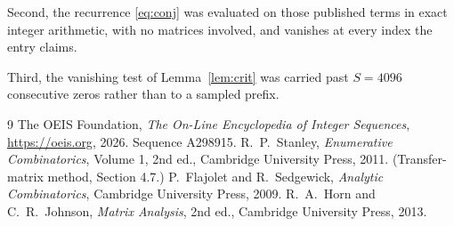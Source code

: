 \documentclass[11pt,a4paper]{article}
\theoremstyle{plain}
\theoremstyle{definition}
\begin{document}
Second, the recurrence \eqref{eq:conj} was evaluated on those published terms in exact
integer arithmetic, with no matrices involved, and vanishes at every index the entry claims.

Third, the vanishing test of Lemma~\ref{lem:crit} was carried past $S=4096$ consecutive
zeros rather than to a sampled prefix.

\begin{thebibliography}{9}
 The OEIS Foundation, \emph{The On-Line Encyclopedia of Integer
Sequences}, \url{https://oeis.org}, 2026. Sequence A298915.
 R.~P.~Stanley, \emph{Enumerative Combinatorics}, Volume 1, 2nd ed.,
Cambridge University Press, 2011. (Transfer-matrix method, Section 4.7.)
 P.~Flajolet and R.~Sedgewick, \emph{Analytic Combinatorics}, Cambridge
University Press, 2009.
 R.~A.~Horn and C.~R.~Johnson, \emph{Matrix Analysis}, 2nd ed., Cambridge
University Press, 2013.
\end{thebibliography}
\end{document}
